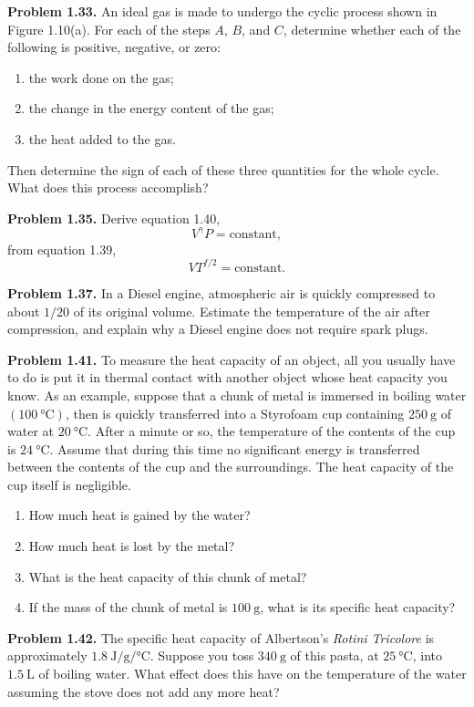 \documentclass[a4paper, 12pt]{config/homework}
\begin{document}
\bigskip\noindent


\bigskip\noindent \textbf{Problem 1.33.} An ideal gas is made to undergo the cyclic process shown in Figure 1.10(a). For each of the steps \(A\), \(B\), and \(C\), determine whether each of the following is positive, negative, or zero:
\begin{enumerate}[label=(\alph*)]
\item the work done on the gas;
\item the change in the energy content of the gas;
\item the heat added to the gas.
\end{enumerate}
Then determine the sign of each of these three quantities for the whole cycle. What does this process accomplish?

\bigskip\noindent


\bigskip\noindent \textbf{Problem 1.35.} Derive equation 1.40,
\[V^\gamma P = \text{constant},\]
from equation 1.39,
\[VT^{f/2} = \text{constant}.\]

\bigskip\noindent


\bigskip\noindent \textbf{Problem 1.37.} In a Diesel engine, atmospheric air is quickly compressed to about \(1/20\) of its original volume. Estimate the temperature of the air after compression, and explain why a Diesel engine does not require spark plugs.

\bigskip\noindent


\bigskip\noindent \textbf{Problem 1.41.} To measure the heat capacity of an object, all you usually have to do is put it in thermal contact with another object whose heat capacity you know. As an example, suppose that a chunk of metal is immersed in boiling water \((\qty{100}{\celsius})\), then is quickly transferred into a Styrofoam cup containing \(\qty{250}{\gram}\) of water at \(\qty{20}{\celsius}\). After a minute or so, the temperature of the contents of the cup is \(\qty{24}{\celsius}\). Assume that during this time no significant energy is transferred between the contents of the cup and the surroundings. The heat capacity of the cup itself is negligible.
\begin{enumerate}[label=\textbf{(\alph*)}]
\item How much heat is gained by the water?
\item How much heat is lost by the metal?
\item What is the heat capacity of this chunk of metal?
\item If the mass of the chunk of metal is \(\qty{100}{\gram}\), what is its specific heat capacity?
\end{enumerate}

\bigskip\noindent


\bigskip\noindent \textbf{Problem 1.42.} The specific heat capacity of Albertson's \textit{Rotini Tricolore} is approximately \(\qty{1.8}{\joule\per\gram\per\celsius}\). Suppose you toss \(\qty{340}{\gram}\) of this pasta, at \(\qty{25}{\celsius}\), into \(\qty{1.5}{\liter}\) of boiling water. What effect does this have on the temperature of the water assuming the stove does not add any more heat?

\bigskip\noindent
\end{document}

